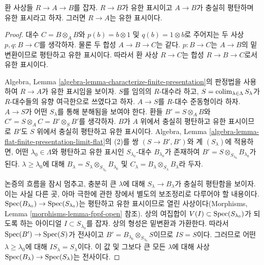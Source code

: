 \begin{lemma}
\label{lemma-flat-finitely-presented-permanence-algebra}
환 사상들 $R \to A \to B$를 잡자. $R \to B$가 유한 표시이고
$A \to B$가 충실히 평탄하며 유한 표시라고 하자. 그러면
$R \to A$는 유한 표시이다.
\end{lemma}

\begin{proof}
대수 $C = B \otimes_A B$와 $p(b) = b \otimes 1$ 및
$q(b) = 1 \otimes b$로 주어지는 두 사상 $p, q : B \to C$를 생각하자.
물론 두 합성 $A \to B \to C$는 같다. $p : B \to C$는
$A \to B$의 밑변환이므로 평탄하고 유한 표시이다. 따라서 환 사상
$R \to C$는 합성 $R \to B \to C$로서 유한 표시이다.

\medskip\noindent
Algebra, Lemma \ref{algebra-lemma-characterize-finite-presentation}의 판정법을
사용하여 $R \to A$가 유한 표시임을 보이자. $S$를 임의의 $R$-대수라 하고,
$S = \mathop{\mathrm{colim}}\nolimits_{\lambda \in \Lambda} S_\lambda$가 $R$-대수들의 유향 여극한으로
쓰였다고 하자. $A \to S$를 $R$-대수 준동형이라 하자. $A \to S$가 어떤
$S_\lambda$를 통해 분해됨을 보여야 한다. 환들
$B' = S \otimes_A B$와 $C' = S \otimes_A C = B' \otimes_S B'$를
생각하자. $B$가 $A$ 위에서 충실히 평탄하고 유한 표시이므로 $B'$도 $S$
위에서 충실히 평탄하고 유한 표시이다. Algebra, Lemma
\ref{algebra-lemma-flat-finite-presentation-limit-flat}의 (2)를 쌍
$(S \to B', B')$와 계 $(S_\lambda)$에 적용하면, 어떤
$\lambda_0 \in \Lambda$와 평탄하고 유한 표시인 $S_{\lambda_0}$-대수
$B_{\lambda_0}$가 존재하여
$B' = S \otimes_{S_{\lambda_0}} B_{\lambda_0}$가 된다.
$\lambda \geq \lambda_0$에 대해
$B_\lambda = S_\lambda \otimes_{S_{\lambda_0}} B_{\lambda_0}$ 및
$C_\lambda = B_\lambda \otimes_{S_\lambda} B_\lambda$라 두자.

\medskip\noindent
논증의 흐름을 잠시 멈추고, 충분히 큰 $\lambda$에 대해
$S_\lambda \to B_\lambda$가 충실히 평탄함을 보이자. 이는 사실 다른 곳,
아마 극한에 관한 장에서 별도의 보조정리로 다루어야 할 내용이다.
$\mathop{\mathrm{Spec}}(B_{\lambda_0}) \to \mathop{\mathrm{Spec}}(S_{\lambda_0})$는 평탄하고 유한 표시이므로
열린 사상이다(Morphisms, Lemma \ref{morphisms-lemma-fppf-open} 참조).
상의 여집합이 $V(I) \subset \mathop{\mathrm{Spec}}(S_{\lambda_0})$가 되도록 하는 아이디얼
$I \subset S_{\lambda_0}$를 잡자. 상의 형성은 밑변환과 가환한다.
따라서 $\mathop{\mathrm{Spec}}(B') \to \mathop{\mathrm{Spec}}(S)$가 전사이고
$B' = B_{\lambda_0} \otimes_{S_{\lambda_0}} S$이므로 $IS = S$이다.
그러므로 어떤 $\lambda \geq \lambda_0$에 대해
$IS_{\lambda} = S_\lambda$이다. 이 값 및 그보다 큰 모든
$\lambda$에 대해 사상 $\mathop{\mathrm{Spec}}(B_\lambda) \to \mathop{\mathrm{Spec}}(S_\lambda)$는 전사이다.


\end{proof}
